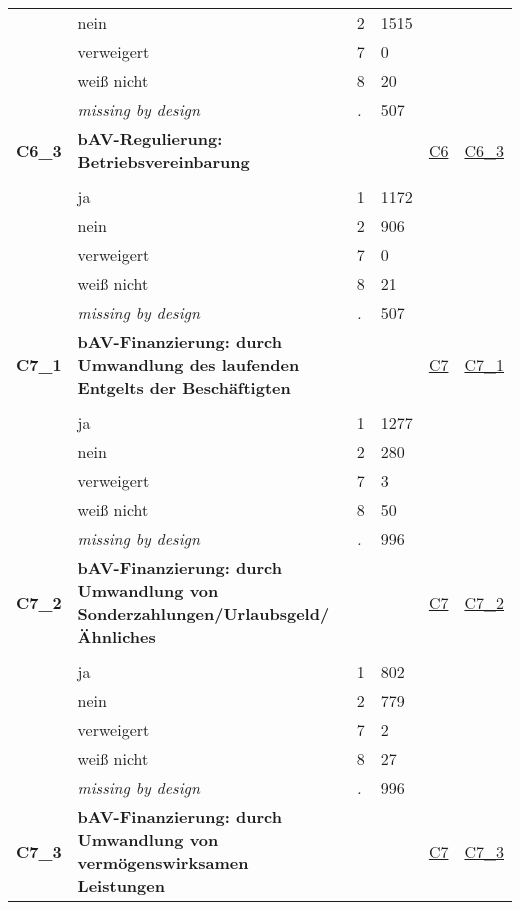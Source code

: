 \begin{longtable}{| L{2.45cm} | L{6cm} | C{1.5cm} | R{1cm} | C{2.25cm} | C{2.25cm} |}
   & nein & 2 & 1515 &  &  \\ 
   & verweigert & 7 & 0 &  &  \\ 
   & weiß nicht & 8 & 20 &  &  \\ 
   & \textit{missing by design} & \textit{.} & 507 &  &  \\ 
   \midrule
\textbf{C6\_3}\label{var:C6:3} & \textbf{bAV-Regulierung: Betriebsvereinbarung} &  &  & \hyperref[C6]{C6} & \hyperref[var:suf:C6:3]{C6\_3} \\ 
   &  &  &  &  &  \\ 
   & ja & 1 & 1172 &  &  \\ 
   & nein & 2 & 906 &  &  \\ 
   & verweigert & 7 & 0 &  &  \\ 
   & weiß nicht & 8 & 21 &  &  \\ 
   & \textit{missing by design} & \textit{.} & 507 &  &  \\ 
   \midrule
\textbf{C7\_1}\label{var:C7:1} & \textbf{bAV-Finanzierung: durch Umwandlung des laufenden Entgelts der Beschäftigten} &  &  & \hyperref[C7]{C7} & \hyperref[var:suf:C7:1]{C7\_1} \\ 
   &  &  &  &  &  \\ 
   & ja & 1 & 1277 &  &  \\ 
   & nein & 2 & 280 &  &  \\ 
   & verweigert & 7 & 3 &  &  \\ 
   & weiß nicht & 8 & 50 &  &  \\ 
   & \textit{missing by design} & \textit{.} & 996 &  &  \\ 
   \midrule
\textbf{C7\_2}\label{var:C7:2} & \textbf{bAV-Finanzierung: durch Umwandlung von Sonderzahlungen/Urlaubsgeld/Ähnliches} &  &  & \hyperref[C7]{C7} & \hyperref[var:suf:C7:2]{C7\_2} \\ 
   &  &  &  &  &  \\ 
   & ja & 1 & 802 &  &  \\ 
   & nein & 2 & 779 &  &  \\ 
   & verweigert & 7 & 2 &  &  \\ 
   & weiß nicht & 8 & 27 &  &  \\ 
   & \textit{missing by design} & \textit{.} & 996 &  &  \\ 
   \midrule
\textbf{C7\_3}\label{var:C7:3} & \textbf{bAV-Finanzierung: durch Umwandlung von vermögenswirksamen Leistungen} &  &  & \hyperref[C7]{C7} & \hyperref[var:suf:C7:3]{C7\_3} \\ 

\end{longtable}
